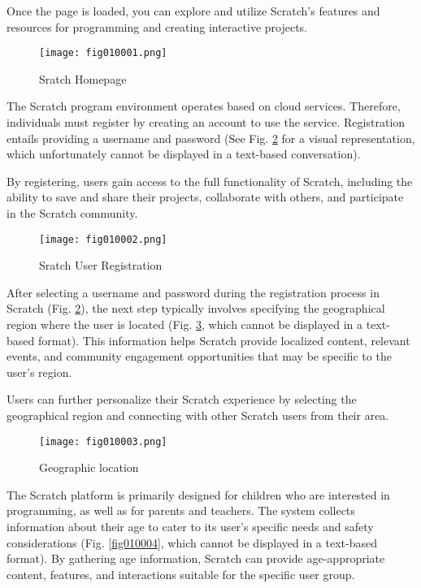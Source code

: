 Once the page is loaded, you can explore and utilize Scratch's features and resources for programming and creating interactive projects.

\begin{figure}[H]
   \centering
   \texttt{[image: fig010001.png]}
   \caption{Sratch Homepage}
\label{fig010001}
\end{figure}

The Scratch program environment operates based on cloud services. Therefore, individuals must register by creating an account to use the service. Registration entails providing a username and password (See Fig. \ref{fig010002} for a visual representation, which unfortunately cannot be displayed in a text-based conversation).

By registering, users gain access to the full functionality of Scratch, including the ability to save and share their projects, collaborate with others, and participate in the Scratch community.

\begin{figure}[H]
   \centering
   \texttt{[image: fig010002.png]}
   \caption{Sratch User Registration}
\label{fig010002}
\end{figure}

After selecting a username and password during the registration process in Scratch (Fig. \ref{fig010002}), the next step typically involves specifying the geographical region where the user is located (Fig. \ref{fig010003}, which cannot be displayed in a text-based format). This information helps Scratch provide localized content, relevant events, and community engagement opportunities that may be specific to the user's region.

Users can further personalize their Scratch experience by selecting the geographical region and connecting with other Scratch users from their area.

\begin{figure}[H]
   \centering
   \texttt{[image: fig010003.png]}
   \caption{Geographic location}
\label{fig010003}
\end{figure}

The Scratch platform is primarily designed for children who are interested in programming, as well as for parents and teachers. The system collects information about their age to cater to its user's specific needs and safety considerations (Fig. \ref{fig010004}, which cannot be displayed in a text-based format). By gathering age information, Scratch can provide age-appropriate content, features, and interactions suitable for the specific user group.

